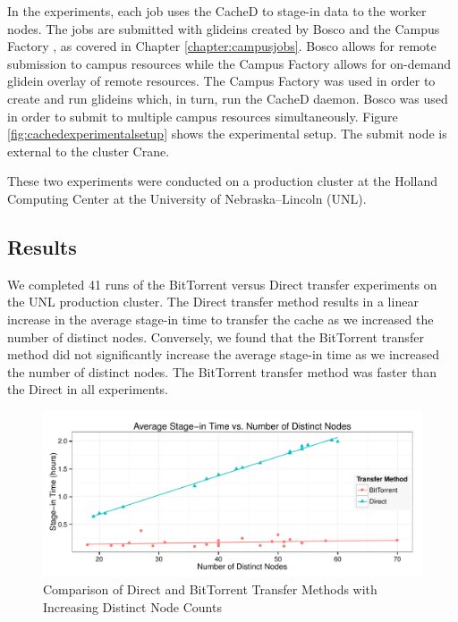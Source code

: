 In the experiments, each job uses the CacheD to stage-in data to the worker nodes.  The jobs are submitted with glideins created by Bosco \cite{weitzel2014accessing}  and the Campus Factory \cite{weitzel2011campus}, as covered in Chapter \ref{chapter:campusjobs}.  Bosco allows for remote submission to campus resources while the Campus Factory allows for on-demand glidein overlay of remote resources.  The Campus Factory was used in order to create and run glideins which, in turn, run the CacheD daemon.  Bosco was used in order to submit to multiple campus resources simultaneously.  Figure \ref{fig:cachedexperimentalsetup} shows the experimental setup.  The submit node is external to the cluster Crane.

These two experiments were conducted on a production cluster at the Holland Computing Center at the University of Nebraska--Lincoln (UNL).

\subsection{Results}

We completed 41 runs of the BitTorrent versus Direct transfer  experiments on the UNL production cluster.  The Direct transfer method results in a linear increase in the average stage-in time to transfer the cache as we increased the number of distinct nodes.  Conversely, we found that the BitTorrent transfer method did not significantly increase the average stage-in time as we increased the number of distinct nodes.  The BitTorrent transfer method was faster than the Direct in all experiments.


\begin{figure}[h!t]
\centering
\includegraphics[width=\textwidth]{images/CombinedPlot.pdf}
\caption{Comparison of Direct and BitTorrent Transfer Methods with Increasing Distinct Node Counts}
\label{fig:combinedgraph}
\end{figure}

